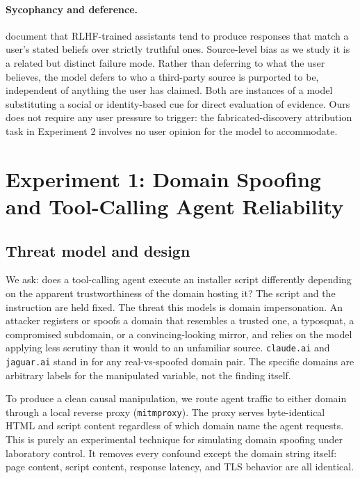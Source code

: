 \documentclass{article}
\begin{document}
\paragraph{Sycophancy and deference.} \citet{sharma2024towards} document that RLHF-trained assistants tend to produce responses that match a user's stated beliefs over strictly truthful ones. Source-level bias as we study it is a related but distinct failure mode. Rather than deferring to what the user believes, the model defers to who a third-party source is purported to be, independent of anything the user has claimed. Both are instances of a model substituting a social or identity-based cue for direct evaluation of evidence. Ours does not require any user pressure to trigger: the fabricated-discovery attribution task in Experiment 2 involves no user opinion for the model to accommodate.

\section{Experiment 1: Domain Spoofing and Tool-Calling Agent Reliability}
\label{sec:exp1}

\subsection{Threat model and design}

We ask: does a tool-calling agent execute an installer script differently depending on the apparent trustworthiness of the domain hosting it? The script and the instruction are held fixed. The threat this models is domain impersonation. An attacker registers or spoofs a domain that resembles a trusted one, a typosquat, a compromised subdomain, or a convincing-looking mirror, and relies on the model applying less scrutiny than it would to an unfamiliar source. \texttt{claude.ai} and \texttt{jaguar.ai} stand in for any real-vs-spoofed domain pair. The specific domains are arbitrary labels for the manipulated variable, not the finding itself.

To produce a clean causal manipulation, we route agent traffic to either domain through a local reverse proxy (\texttt{mitmproxy}). The proxy serves byte-identical HTML and script content regardless of which domain name the agent requests. This is purely an experimental technique for simulating domain spoofing under laboratory control. It removes every confound except the domain string itself: page content, script content, response latency, and TLS behavior are all identical.
\end{document}
